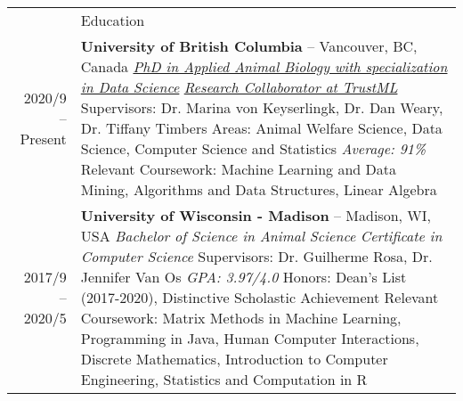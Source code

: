 \documentclass[letterpaper, 11pt]{article}
\newcommand{\headingfont}{\Large\color{OliveGreen}}
\newenvironment{SectionTable}[1]{
	\renewcommand*{\arraystretch}{1.7}
	\setlength{\tabcolsep}{10pt}
	\begin{longtable}{Rp{5.2in}} & #1 \\}
{\end{longtable}\vspace{-.3cm}}
\begin{document}
\begin{SectionTable}{\headingfont Education}
2020/9 -- Present & 
\textbf{University of British Columbia} -- Vancouver, BC, Canada \newline
\textit{\href{https://awp.landfood.ubc.ca/people/graduate-students/kehan-sheng/}{PhD in Applied Animal Biology with specialization in Data Science}} \newline 
\textit{\href{https://trustml.ubc.ca/profiles/sky-sheng}{Research Collaborator at TrustML}} \newline 
Supervisors: Dr. Marina von Keyserlingk, Dr. Dan Weary, Dr. Tiffany Timbers \newline
Areas: Animal Welfare Science, Data Science, Computer Science and Statistics \newline
\textit{Average: 91\%} \newline
Relevant Coursework: Machine Learning and Data Mining, Algorithms and Data Structures, Linear Algebra \\

2017/9 -- 2020/5 & 
\textbf{University of Wisconsin - Madison} -- Madison, WI, USA \newline
\textit{Bachelor of Science in Animal Science} \newline 
\textit{Certificate in Computer Science} \newline 
Supervisors: Dr. Guilherme Rosa, Dr. Jennifer Van Os \newline
\textit{GPA: 3.97/4.0} \newline
Honors: Dean's List (2017-2020), Distinctive Scholastic Achievement \newline
Relevant Coursework: Matrix Methods in Machine Learning, Programming in Java, Human Computer Interactions, Discrete Mathematics, Introduction to Computer Engineering, Statistics and Computation in R \\
\end{SectionTable}
\end{document}
